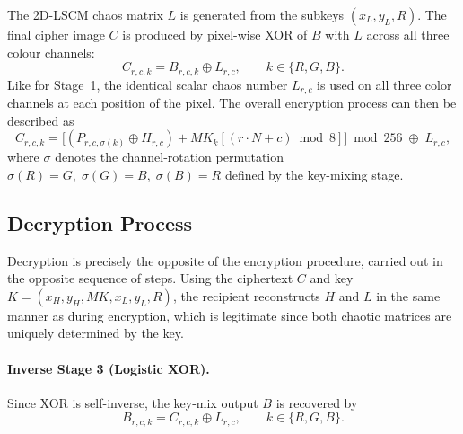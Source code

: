 The 2D-LSCM chaos matrix $L$ is generated from the subkeys
$(x_L, y_L, R)$.
The final cipher image $C$ is produced by pixel-wise XOR of $B$
with $L$ across all three colour channels:
\begin{equation}
    C_{r,c,k} = B_{r,c,k} \oplus L_{r,c},
    \qquad k \in \{R,G,B\}.
    \label{eq:lscm_enc}
\end{equation}
Like for Stage~1, the identical scalar chaos number $L_{r,c}$ is used on
all three color channels at each position of the pixel.
The overall encryption process can then be described as
\begin{equation}
    C_{r,c,k}
    = \bigl[(P_{r,c,\sigma(k)} \oplus H_{r,c})
             + MK_k[(r \cdot N + c) \bmod 8]\bigr] \bmod 256
      \;\oplus\; L_{r,c},
    \label{eq:full_pipeline}
\end{equation}
where $\sigma$ denotes the channel-rotation permutation
$\sigma(R)=G,\;\sigma(G)=B,\;\sigma(B)=R$ defined by the key-mixing
stage.

\subsection{Decryption Process}
\label{subsec:decryption}

Decryption is precisely the opposite of the encryption procedure,
carried out in the opposite sequence of steps.
Using the ciphertext $C$ and key $K = (x_H, y_H, MK, x_L, y_L, R)$,
the recipient reconstructs $H$ and $L$ in the same manner as during encryption,
which is legitimate since both chaotic matrices are uniquely determined by the key.

\paragraph{Inverse Stage 3 (Logistic XOR).}
Since XOR is self-inverse, the key-mix output $B$ is recovered by
\begin{equation}
    B_{r,c,k} = C_{r,c,k} \oplus L_{r,c},
    \qquad k \in \{R,G,B\}.
    \label{eq:lscm_dec}
\end{equation}

